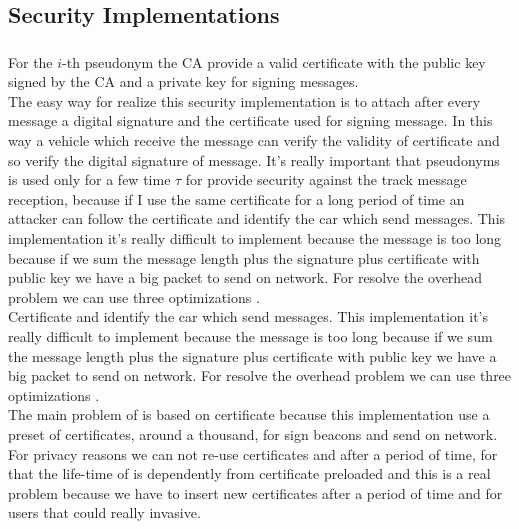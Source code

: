 \subsection{Security Implementations}
\subsubsection{\baseline}
For the $i$-th pseudonym the CA provide a valid certificate with the public key signed by the CA and a private key for signing messages.\\
The easy way for realize this security implementation is to attach after every message a digital signature and the certificate used for signing message. In this way a vehicle which receive the message can verify the validity of certificate and so verify the digital signature of message. It's really important that pseudonyms is used only for a few time $\tau$ for provide security against the track message reception, because if I use the same certificate for a long period of time an attacker can follow the certificate and identify the car which send messages. This implementation it's really difficult to implement because the message is too long because if we sum the message length plus the signature plus certificate with public key we have a big packet to send on network. For resolve the overhead problem we can use three optimizations \cite{calandriello}.\\Certificate and identify the car which send messages. This implementation it's really difficult to implement because the message is too long because if we sum the message length plus the signature plus certificate with public key we have a big packet to send on network. For resolve the overhead problem we can use three optimizations \cite{calandriello}.\\
The main problem of \baseline is based on certificate because this implementation use a preset of certificates, around a thousand, for sign beacons and send on network. For privacy reasons we can not re-use certificates and after a period of time, for that the life-time of \baseline is dependently from certificate preloaded and this is a real problem because we have to insert new certificates after a period of time and for users that could really invasive.
